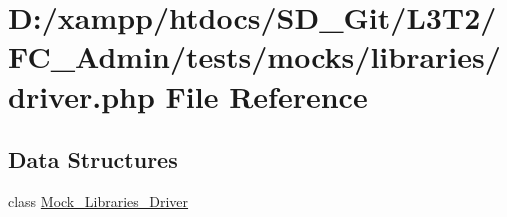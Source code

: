 \hypertarget{_admin_2tests_2mocks_2libraries_2_driver_8php}{}\section{D\+:/xampp/htdocs/\+S\+D\+\_\+\+Git/\+L3\+T2/\+F\+C\+\_\+\+Admin/tests/mocks/libraries/driver.php File Reference}
\label{_admin_2tests_2mocks_2libraries_2_driver_8php}
\subsection*{Data Structures}
\begin{DoxyCompactItemize}
\item 
class \hyperlink{class_mock___libraries___driver}{Mock\+\_\+\+Libraries\+\_\+\+Driver}
\end{DoxyCompactItemize}
